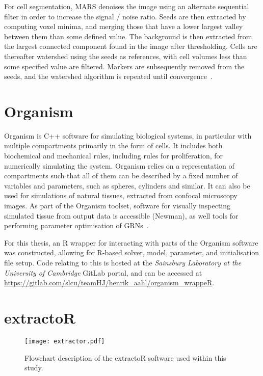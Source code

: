 For cell segmentation, MARS denoises the image using an alternate sequential filter in
order to increase the signal / noise ratio. Seeds are then extracted by
computing voxel minima, and merging those that have a lower largest valley
between them than some defined value. The background is then extracted from the
largest connected component found in the image after thresholding. Cells are
thereafter watershed using the seeds as references, with cell volumes less than
some specified value are filtered. Markers are subsequently removed from the
seeds, and the watershed algorithm is repeated until
convergence~\cite{fernandez2010imaging}.

\section{Organism}
\label{sec:organism}
Organism is C++ software for simulating biological systems, in particular with
multiple compartments primarily in the form of cells. It includes both
biochemical and mechanical rules, including rules for proliferation, for
numerically simulating the system. Organism relies on a representation of
compartments such that all of them can be described by a fixed number of
variables and parameters, such as spheres, cylinders and similar. It can also be
used for simulations of natural tissues, extracted from confocal microscopy
images. As part of the Organism toolset, software for visually inspecting
simulated tissue from output data is accessible (Newman), as well tools for
performing parameter optimisation of
GRNs~\cite{jonsson2005explicit,gruel2016epidermis}.

For this thesis, an R wrapper for interacting with parts of the Organism software was
constructed, allowing for R-based solver, model, parameter, and initialisation file setup.
Code relating to this is hosted at the \textit{Sainsbury Laboratory at the University of
  Cambridge} GitLab portal, and can be accessed at 
\url{https://gitlab.com/slcu/teamHJ/henrik_aahl/organism_wrappeR}.

\section{extractoR}
\label{sec:extractoR}
\begin{figure}[H]
  \centering
  \texttt{[image: extractor.pdf]}
  \caption[extractoR flowchart]{Flowchart description of the extractoR software used within this
    study.}
  \label{fig:extractor}
\end{figure}

